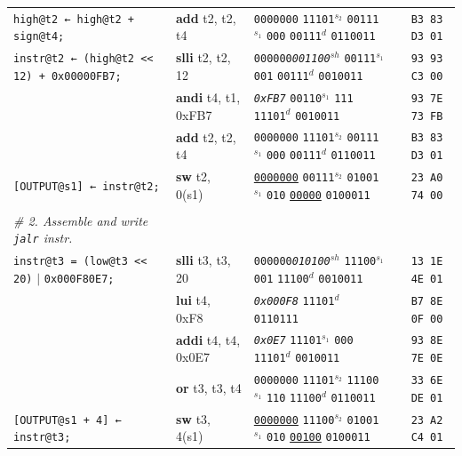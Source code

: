 \documentclass[a4paper,12pt,final]{article}
\begin{document}
\begin{table}[!htbp]
\begin{adjustwidth}{-1cm}{-1cm}
\begin{center}
\begin{tabular}{l|ll|l|l}
\texttt{high@t2 ← high@t2 + sign@t4;} & \textbf{add} t2, t2, t4 & \texttt{0000000} \texttt{11101}​\(^{s_{2}}\) \texttt{00111}​\(^{s_{1}}\) \texttt{000} \texttt{00111}​\(^{d}\)  \texttt{0110011} &  & \texttt{B3 83 D3 01}\\[0pt]
\texttt{instr@t2 ← (high@t2 <{}<{} 12) + 0x00000FB7;} & \textbf{slli} t2, t2, 12 & \texttt{000000}​\emph{\texttt{001100}}​\(^{sh}\)         \texttt{00111}​\(^{s_{1}}\) \texttt{001} \texttt{00111}​\(^{d}\)  \texttt{0010011} &  & \texttt{93 93 C3 00}\\[0pt]
 & \textbf{andi} t4, t1, 0xFB7 & \emph{\texttt{0xFB7}}                    \texttt{00110}​\(^{s_{1}}\) \texttt{111} \texttt{11101}​\(^{d}\)  \texttt{0010011} &  & \texttt{93 7E 73 FB}\\[0pt]
 & \textbf{add} t2, t2, t4 & \texttt{0000000} \texttt{11101}​\(^{s_{2}}\) \texttt{00111}​\(^{s_{1}}\) \texttt{000} \texttt{00111}​\(^{d}\)  \texttt{0110011} &  & \texttt{B3 83 D3 01}\\[0pt]
\texttt{[OUTPUT@s1] ← instr@t2;} & \textbf{sw} t2, 0(s1) & \uline{\texttt{0000000}} \texttt{00111}​\(^{s_{2}}\) \texttt{01001}​\(^{s_{1}}\) \texttt{010} \uline{\texttt{00000}} \texttt{0100011} &  & \texttt{23 A0 74 00}\\[0pt]
 &  &  &  & \\[0pt]
\emph{\# 2. Assemble and write \texttt{jalr} instr.} &  &  &  & \\[0pt]
\texttt{instr@t3 = (low@t3 <{}<{} 20)} \(\vert{}\) \texttt{0x000F80E7;} & \textbf{slli} t3, t3, 20 & \texttt{000000}​\emph{\texttt{010100}}​\(^{sh}\)         \texttt{11100}​\(^{s_{1}}\) \texttt{001} \texttt{11100}​\(^{d}\)  \texttt{0010011} &  & \texttt{13 1E 4E 01}\\[0pt]
 & \textbf{lui} t4, 0xF8 & \emph{\texttt{0x000F8}}                                                  \texttt{11101}​\(^{d}\)  \texttt{0110111} &  & \texttt{B7 8E 0F 00}\\[0pt]
 & \textbf{addi} t4, t4, 0x0E7 & \emph{\texttt{0x0E7}}                    \texttt{11101}​\(^{s_{1}}\) \texttt{000} \texttt{11101}​\(^{d}\)  \texttt{0010011} &  & \texttt{93 8E 7E 0E}\\[0pt]
 & \textbf{or} t3, t3, t4 & \texttt{0000000} \texttt{11101}​\(^{s_{2}}\) \texttt{11100}​\(^{s_{1}}\) \texttt{110} \texttt{11100}​\(^{d}\)  \texttt{0110011} &  & \texttt{33 6E DE 01}\\[0pt]
\texttt{[OUTPUT@s1 + 4] ← instr@t3;} & \textbf{sw} t3, 4(s1) & \uline{\texttt{0000000}} \texttt{11100}​\(^{s_{2}}\) \texttt{01001}​\(^{s_{1}}\) \texttt{010} \uline{\texttt{00100}} \texttt{0100011} &  & \texttt{23 A2 C4 01}\\[0pt]

\end{tabular}
\end{center}
\end{adjustwidth}
\end{table}
\end{document}
